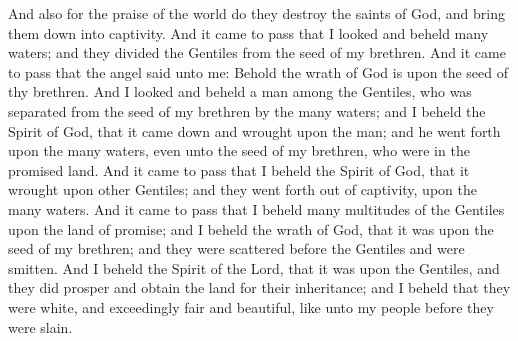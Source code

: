 And also for the praise of the world do they destroy the saints of God, and bring them down into captivity.
\bverse \iffalse And it came to pass that I looked and beheld many waters; and they divided the Gentiles from the seed of my brethren. \fi
And it came to pass that I looked and beheld many waters; and they divided the Gentiles from the seed of my brethren.
\bverse \iffalse And it came to pass that the angel said unto me: Behold the wrath of God is upon the seed of thy brethren. \fi
And it came to pass that the angel said unto me: Behold the wrath of God is upon the seed of thy brethren.
\bverse \iffalse And I looked and beheld a man among the Gentiles, who was separated from the seed of my brethren by the many waters; and I beheld the Spirit of God, that it came down and wrought upon the man; and he went forth upon the many waters, even unto the seed of my brethren, who were in the promised land. \fi
And I looked and beheld a man among the Gentiles, who was separated from the seed of my brethren by the many waters; and I beheld the Spirit of God, that it came down and wrought upon the man; and he went forth upon the many waters, even unto the seed of my brethren, who were in the promised land.
\bverse \iffalse And it came to pass that I beheld the Spirit of God, that it wrought upon other Gentiles; and they went forth out of captivity, upon the many waters. \fi
And it came to pass that I beheld the Spirit of God, that it wrought upon other Gentiles; and they went forth out of captivity, upon the many waters.
\bverse \iffalse And it came to pass that I beheld many multitudes of the Gentiles upon the land of promise; and I beheld the wrath of God, that it was upon the seed of my brethren; and they were scattered before the Gentiles and were smitten. \fi
And it came to pass that I beheld many multitudes of the Gentiles upon the land of promise; and I beheld the wrath of God, that it was upon the seed of my brethren; and they were scattered before the Gentiles and were smitten.
\bverse \iffalse And I beheld the Spirit of the Lord, that it was upon the Gentiles, and they did prosper and obtain the land for their inheritance; and I beheld that they were white, and exceedingly fair and beautiful, like unto my people before they were slain. \fi
And I beheld the Spirit of the Lord, that it was upon the Gentiles, and they did prosper and obtain the land for their inheritance; and I beheld that they were white, and exceedingly fair and beautiful, like unto my people before they were slain.
